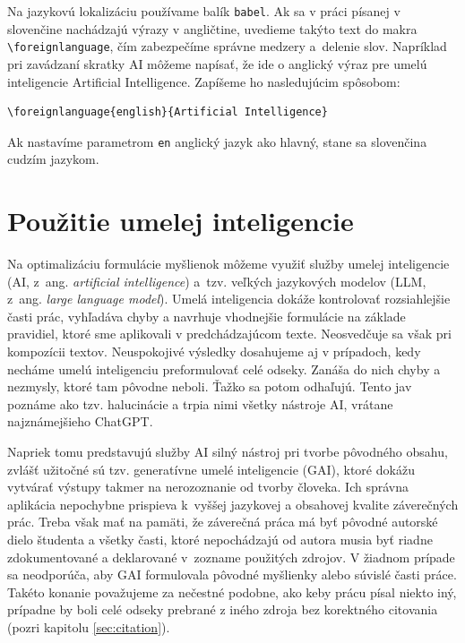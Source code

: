 Na jazykovú lokalizáciu používame balík \verb|babel|.
Ak sa v práci písanej v slovenčine nachádzajú výrazy v angličtine,
uvedieme takýto text do makra \verb|\foreignlanguage|, čím zabezpečíme správne medzery a~delenie slov.
Napríklad pri zavádzaní skratky AI môžeme napísať, že ide o anglický výraz pre umelú inteligencie \foreignlanguage{english}{Artificial Intelligence}.
Zapíšeme ho nasledujúcim spôsobom:
\begin{verbatim}
\foreignlanguage{english}{Artificial Intelligence}
\end{verbatim}

Ak nastavíme parametrom \verb|en| anglický jazyk ako hlavný, stane sa slovenčina cudzím jazykom.

\section{Použitie umelej inteligencie}\label{sec:utilizingAI}
Na optimalizáciu formulácie myšlienok môžeme využiť služby
umelej inteligencie (AI, z~ang. \emph{\foreignlanguage{english}{artificial intelligence}}) a~tzv. veľkých jazykových modelov (LLM, z~ang. \emph{\foreignlanguage{english}{large language model}}).
Umelá inteligencia dokáže kontrolovať rozsiahlejšie časti prác,
vyhľadáva chyby a navrhuje vhodnejšie
formulácie na základe pravidiel,
ktoré sme aplikovali v predchádzajúcom texte.
Neosvedčuje sa však pri kompozícii textov.
Neuspokojivé výsledky dosahujeme aj v prípadoch,
kedy necháme umelú inteligenciu preformulovať celé odseky.
Zanáša do nich chyby a nezmysly, ktoré tam pôvodne neboli.
Ťažko sa potom odhaľujú.
Tento jav poznáme ako tzv.
halucinácie a trpia nimi všetky nástroje AI,
vrátane najznámejšieho ChatGPT.

Napriek tomu predstavujú služby AI silný nástroj pri tvorbe pôvodného obsahu, zvlášť užitočné sú tzv. generatívne umelé inteligencie (GAI),
ktoré dokážu vytvárať výstupy takmer na nerozoznanie od tvorby človeka.
Ich správna aplikácia nepochybne prispieva k~vyššej jazykovej a obsahovej kvalite záverečných prác.
Treba však mať na pamäti, že záverečná práca má byť
pôvodné autorské dielo študenta a všetky časti,
ktoré nepochádzajú od autora musia byť riadne
zdokumentované a deklarované v~zozname použitých zdrojov.
V žiadnom prípade sa neodporúča, aby
GAI formulovala pôvodné myšlienky
alebo súvislé časti práce.
Takéto konanie považujeme za nečestné podobne,
ako keby prácu písal niekto iný,
prípadne by boli celé odseky prebrané z iného zdroja bez korektného citovania (pozri kapitolu \ref{sec:citation}).

